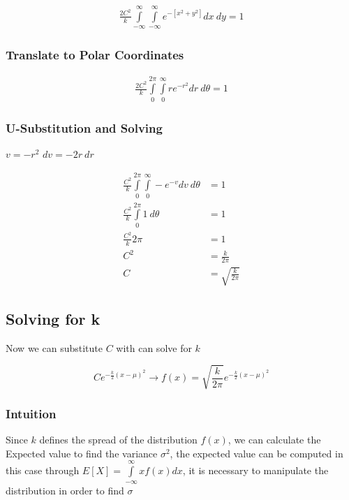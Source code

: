 \documentclass{article}
\begin{document}
\begin{align}
  \frac{2C^2}{k}\int\limits_{-\infty}^{\infty}\int\limits_{-\infty}^{\infty}e^{-\left[ x^2+y^2 \right]} dx\ dy = 1
\end{align}

\subsubsection{Translate to Polar Coordinates}

\begin{align}
  \frac{2C^2}{k}\int\limits_{0}^{2\pi}\int\limits_{0}^{\infty}re^{-r^2} dr\ d\theta = 1
\end{align}

\subsubsection{U-Substitution and Solving}

\begin{multicols}{2}
  $v = -r^2$
  \vfill\columnbreak
  $dv = -2r\ dr$
\end{multicols}

\begin{align}
  \frac{C^2}{k}\int\limits_{0}^{2\pi}\int\limits_{0}^{\infty}-e^{-v}dv\ d\theta &= 1\\
  \frac{C^2}{k}\int\limits_{0}^{2\pi}1\ d\theta &= 1\\
  \frac{C^2}{k}2\pi &= 1\\
  C^2 &= \frac{k}{2\pi}\\
  C &= \sqrt{\frac{k}{2\pi}}
\end{align}

\subsection{Solving for k}

Now we can substitute $C$ with can solve for $k$

\begin{equation}
  \label{eq:Distribution}
  Ce^{-\frac{k}{2}\left( x - \mu \right)^2} \longrightarrow f(x)=\sqrt{\frac{k}{2\pi}}e^{-\frac{k}{2}\left( x - \mu \right)^2}
\end{equation}

\subsubsection{Intuition}

Since $k$ defines the spread of the distribution $f(x)$, we can calculate the
Expected value to find the variance $\sigma^2$, the expected value can be
computed in this case through $E[X]=\int\limits_{-\infty}^{\infty}xf(x)dx$, it
is necessary to manipulate the distribution in order to find $\sigma$
\end{document}
